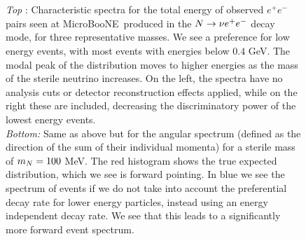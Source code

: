 \documentclass[11pt, a4paper]{article}
\def\muboone{MicroBooNE}
\def\ster{\ensuremath N}
\begin{document}
\begin{figure}[t]
\begin{subfigure}[t]{\textwidth}
	\center
	\large

	\resizebox{\columnwidth}{!}{}\\

\end{subfigure}\\

\begin{subfigure}[c]{\textwidth}
	\center
	\large
	\resizebox{0.7\columnwidth}{!}{}

	\end{subfigure}

	\caption{\label{fig:spectrum_ee} \emph{Top} : Characteristic spectra for the total energy of observed  $e^+e^-$ pairs seen at \muboone\ produced in the $\ster \to \nu e^+e^-$ decay mode, for three representative masses. We see a preference for low energy events, with most events with energies below $0.4$ GeV. The modal peak of the distribution moves to higher energies as the mass of the sterile neutrino increases. On the left, the spectra have no analysis cuts or detector reconstruction effects applied, while on the right these are included, decreasing the discriminatory power of the lowest energy events.\\
		\emph{Bottom: }	 Same as above but for the angular spectrum (defined as the direction of the sum of their individual momenta) for a sterile mass of $m_\ster = 100$ MeV. The red histogram shows the true expected distribution, which we see is forward pointing. In blue we see the spectrum of events if we do not take into account the preferential
		decay rate for lower energy particles, instead using an energy independent
		decay rate. We see that this leads to a significantly more forward event 
		spectrum.	}
\end{figure}
\end{document}
